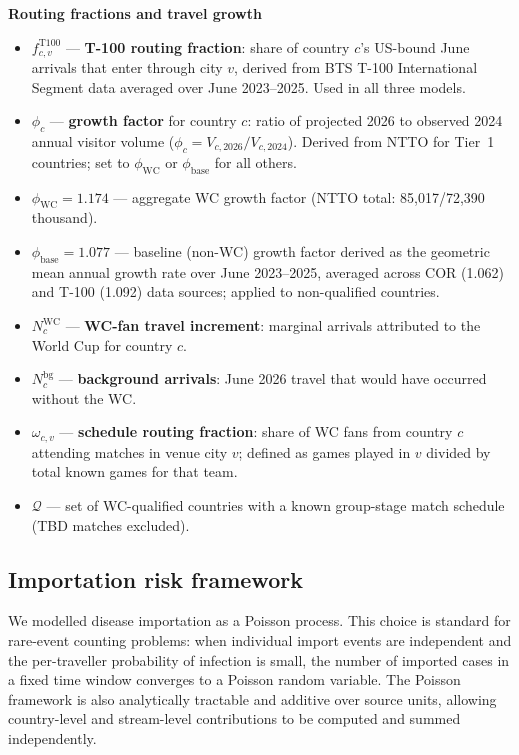 \documentclass[12pt]{article}
\begin{document}
\vspace{0.5em}
\noindent\textbf{Routing fractions and travel growth}
\begin{itemize}
  \item $f_{c,v}^{\text{T100}}$ --- \textbf{T-100 routing fraction}:
    share of country $c$'s US-bound June arrivals that enter through
    city $v$, derived from BTS T-100 International Segment data
    averaged over June 2023--2025. Used in all three models.
  \item $\phi_c$ --- \textbf{growth factor} for country $c$:
    ratio of projected 2026 to observed 2024 annual visitor volume
    ($\phi_c = V_{c,2026}/V_{c,2024}$). Derived from NTTO for Tier~1
    countries; set to $\phi_{\text{WC}}$ or $\phi_{\text{base}}$ for
    all others.
  \item $\phi_{\text{WC}} = 1.174$ --- aggregate WC growth factor
    (NTTO total: 85,017/72,390 thousand).
  \item $\phi_{\text{base}} = 1.077$ --- baseline (non-WC) growth
    factor derived as the geometric mean annual growth rate over
    June 2023--2025, averaged across COR (1.062) and T-100 (1.092)
    data sources; applied to non-qualified countries.
  \item $N_c^{\text{WC}}$ --- \textbf{WC-fan travel increment}:
    marginal arrivals attributed to the World Cup for country $c$.
  \item $N_c^{\text{bg}}$ --- \textbf{background arrivals}: June
    2026 travel that would have occurred without the WC.
  \item $\omega_{c,v}$ --- \textbf{schedule routing fraction}:
    share of WC fans from country $c$ attending matches in venue
    city $v$; defined as games played in $v$ divided by total known
    games for that team.
  \item $\mathcal{Q}$ --- set of WC-qualified countries with a
    known group-stage match schedule (TBD matches excluded).
\end{itemize}

\subsection*{Importation risk framework}

We modelled disease importation as a Poisson process. This choice
is standard for rare-event counting problems: when individual import
events are independent and the per-traveller probability of infection
is small, the number of imported cases in a fixed time window
converges to a Poisson random variable. The Poisson framework is also
analytically tractable and additive over source units, allowing
country-level and stream-level contributions to be computed and
summed independently.
\end{document}
